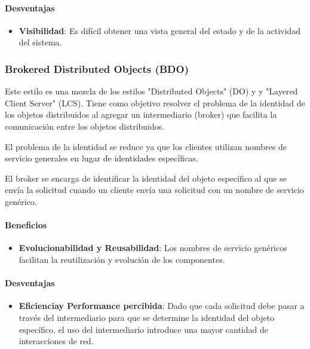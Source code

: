 \documentclass{article}
\begin{document}
			\paragraph{Desventajas}
				\begin{itemize}	
					
					\item {\textbf{Visibilidad}}: Es difícil obtener una vista general del estado y de la
					actividad del sistema.
					
				\end{itemize}
			
			\subsubsection{Brokered Distributed Objects (BDO)}
			
			Este estilo es una mezcla de los estilos "Distributed Objects" (DO) y y "Layered Client Server" (LCS). Tiene como objetivo resolver el problema de la identidad de los objetos distribuidos al agregar un intermediario (broker) que facilita la comunicación entre los objetos distribuidos.
			
			
			El problema de la identidad se reduce ya que los clientes utilizan nombres de servicio generales en lugar de identidades específicas.
			
			El broker se encarga de identificar la identidad del objeto específico al que se envía la solicitud cuando un cliente envía una solicitud con un nombre de servicio genérico.
			
			\paragraph{Beneficios}
			\begin{itemize}	
				\item {\textbf{Evolucionabilidad y Reusabilidad}}: Los nombres de servicio genéricos facilitan la reutilización y evolución de los componentes.
				
				
			\end{itemize}
			
			\paragraph{Desventajas}
			\begin{itemize}	
				
				\item {\textbf{Eficienciay Performance percibida}}: Dado que cada solicitud debe pasar a través del intermediario para que se determine la identidad del objeto específico, el uso del intermediario introduce una mayor cantidad de interacciones de red.
				
			\end{itemize}
		
\end{document}
